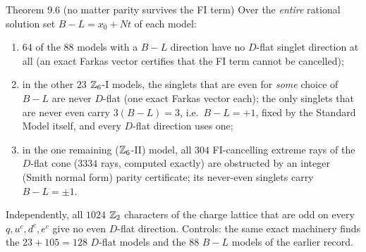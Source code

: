 \begin{result}{Theorem 9.6 (no matter parity survives the FI term) \hfill \tierC}
Over the \emph{entire} rational solution set $B-L=x_0+Nt$ of each model:
\begin{enumerate}[label=(\roman*),leftmargin=1.5em]
\item $64$ of the $88$ models with a $B-L$ direction have no $D$-flat singlet direction at all
      (an exact Farkas vector certifies that the FI term cannot be cancelled);
\item in the other $23$ $\mathbb{Z}_6$-I models, the singlets that are even for \emph{some} choice of
      $B-L$ are never $D$-flat (one exact Farkas vector each); the only singlets that are
      never even carry $3(B-L)=3$, i.e.\ $B-L=+1$, fixed by the Standard Model itself, and every
      $D$-flat direction uses one;
\item in the one remaining ($\mathbb{Z}_6$-II) model, all $304$ FI-cancelling extreme rays of the $D$-flat
      cone ($3334$ rays, computed exactly) are obstructed by an integer (Smith normal form)
      parity certificate; its never-even singlets carry $B-L=\pm1$.
\end{enumerate}
Independently, all $1024$ $\mathbb{Z}_2$ characters of the charge lattice that are odd on every
$q,u^c,d^c,e^c$ give no even $D$-flat direction. Controls: the same exact machinery finds
the $23+105=128$ $D$-flat models and the $88$ $B-L$ models of the earlier record.
\end{result}

